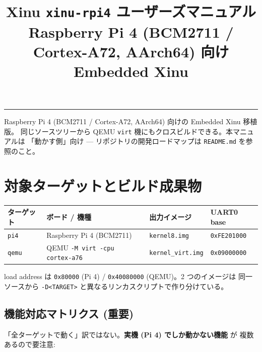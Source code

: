 \documentclass[a4paper,11pt]{ltjsarticle}
\title{\textbf{Xinu \texttt{xinu-rpi4} ユーザーズマニュアル}\\[2pt]
       \large Raspberry Pi 4 (BCM2711 / Cortex-A72, AArch64) 向け Embedded Xinu}
\author{}
\date{}
\begin{document}
\maketitle
\vspace{-2.2em}
\begin{center}\rule{0.9\textwidth}{0.4pt}\end{center}

Raspberry Pi 4 (BCM2711 / Cortex-A72, AArch64) 向けの Embedded Xinu 移植版。
同じソースツリーから QEMU \texttt{virt} 機にもクロスビルドできる。本マニュアルは
「動かす側」向け --- リポジトリの開発ロードマップは \texttt{README.md} を参照のこと。

{\small\tableofcontents}
\bigskip

\section{対象ターゲットとビルド成果物}

\begin{center}\footnotesize
\begin{tabular}{@{}l l l l@{}}
\toprule
\textbf{ターゲット} & \textbf{ボード / 機種} & \textbf{出力イメージ} & \textbf{UART0 base}\\
\midrule
\verb|pi4|  & Raspberry Pi 4 (BCM2711) & \verb|kernel8.img|     & \verb|0xFE201000|\\
\verb|qemu| & QEMU \verb|-M virt -cpu cortex-a76| & \verb|kernel_virt.img| & \verb|0x09000000|\\
\bottomrule
\end{tabular}
\end{center}

load address は \verb|0x80000| (Pi 4) / \verb|0x40080000| (QEMU)。2 つのイメージは
同一ソースから \verb|-D<TARGET>| と異なるリンカスクリプトで作り分けている。

\subsection{機能対応マトリクス (重要)}

「全ターゲットで動く」訳ではない。\textbf{実機 (Pi 4) でしか動かない機能} が
複数あるので要注意:
\end{document}
